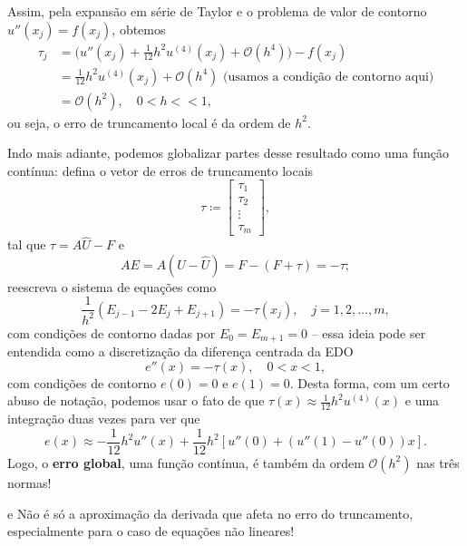 \documentclass[../differential_methods.tex]{subfiles}
\begin{document}
Assim, pela expansão em série de Taylor e o problema de valor de contorno \(u''(x_{j}) = f(x_{j})\), obtemos
\begin{align*}
	\tau_{j} & = \biggl(u''(x_{j}) + \frac{1}{12}h^{2}u^{(4)}(x_{j})+\mathcal{O}(h^{4})\biggr)-f(x_{j})                                             \\
	         & = \frac{1}{12}h^{2}u^{(4)}(x_{j})+\mathcal{O}(h^{4})                                    \text{ (usamos a condição de contorno aqui)} \\
	         & = \mathcal{O}(h^{2}), \quad 0<h<<1,
\end{align*}
ou seja, o erro de truncamento local é da ordem de \(h^{2}.\)

Indo mais adiante, podemos globalizar partes desse resultado como uma função contínua: defina o vetor de erros de truncamento locais
\[
	\tau\coloneqq \begin{bmatrix}
		\tau_1 \\
		\tau_2 \\
		\vdots \\
		\tau_{m}
	\end{bmatrix},
\]
tal que \(\tau = A \hat{U}-F\) e
\[
	AE = A(U-\hat{U})=F-(F+\tau) = -\tau;
\]
reescreva o sistema de equações como
\[
	\frac{1}{h^{2}}(E_{j-1}-2E_{j}+E_{j+1}) = -\tau (x_{j}),\quad j=1,2,\dotsc ,m,
\]
com condições de contorno dadas por \(E_{0}=E_{m+1}=0\) -- essa ideia pode ser entendida como a discretização da diferença centrada da EDO
\[
	e''(x) = -\tau (x), \quad 0<x<1,
\]
com condições de contorno \(e(0)=0\) e \(e(1)=0.\) Desta forma, com um certo abuso de notação, podemos usar o fato de que \(\tau(x)\approx \frac{1}{12}h^{2}u^{(4)}(x)\) e uma integração duas vezes para ver que
\[
	e(x)\approx -\frac{1}{12}h^{2}u''(x) + \frac{1}{12}h^{2}[u''(0)+(u''(1)-u''(0))x].
\]
Logo, o \textbf{erro global}, uma função contínua, é também da ordem \(\mathcal{O}(h^{2})\) nas três normas!

\begin{tcolorbox}[
		skin=enhanced,
		title=Observação,
		fonttitle=\bfseries,
		colframe=black,
		colbacktitle=cyan!75!white,
		colback=cyan!15,
		colbacklower=black,
		coltitle=black,
		drop fuzzy shadow,
	] e
	Não é só a aproximação da derivada que afeta no erro do truncamento, especialmente para o caso de equações não lineares!
\end{tcolorbox}
\end{document}
